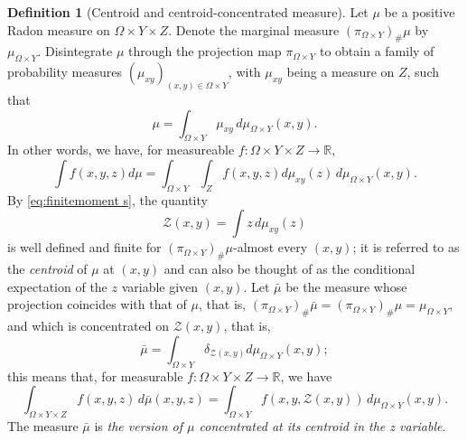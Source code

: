 \documentclass{article}
\newcommand{\R}{\mathbb{R}}
\theoremstyle{definition}
\newtheorem{definition}[theorem]{Definition}
\theoremstyle{remark}
\newcommand{\proj}{\pi}
\newcommand{\projXY}{\proj_{\Omega\times Y}}
\begin{document}
\begin{definition}[Centroid and centroid-concentrated measure]
\label{def:centroid}
 Let $\mu$ be a positive Radon measure on $\Omega\times Y\times Z$.
 Denote the marginal measure $(\projXY)_\#\mu$ by $\mu_{\Omega\times Y}$.
 Disintegrate $\mu$ through the projection map $\projXY{}$
to obtain a family of probability measures $(\mu_{xy})_{(x,y)\in\Omega\times Y}$, with $\mu_{xy}$ being a measure on $Z$, such that
%
\[\mu=\int_{\Omega\times Y}\mu_{xy}\,d \mu_{\Omega\times Y}(x,y).\]
In other words, we have, for measureable $f\colon\Omega\times Y\times Z\to\R$,
\[\int f(x,y,z) d\mu=\int_{\Omega\times Y} \int_Z f(x,y,z)d\mu_{xy}(z)\,d \mu_{\Omega\times Y}(x,y).\]
%
By \eqref{eq:finitemoment s}, the quantity
\begin{equation}\label{eq:defZ}
 \mathcal Z(x,y)=\int z\,d\mu_{xy}(z)
\end{equation}
is well defined and finite for $(\projXY)_\#\mu$-almost every $(x,y)$; it is referred to as the \emph{centroid} of $\mu$ at $(x,y)$ and can also be thought of as the conditional expectation of the $z$ variable given $(x,y)$. Let $\bar \mu$ be the measure whose projection coincides with that of $\mu$, that is, $(\projXY)_\#\bar\mu=(\projXY)_\#\mu=\mu_{\Omega\times Y}$, and which is concentrated on $\mathcal Z(x,y)$, that is,
\[\bar\mu=\int_{\Omega\times Y}\delta_{\mathcal Z(x,y)}d\mu_{\Omega\times Y}(x,y);\]
this means that, for measurable $f\colon\Omega\times Y\times Z\to\R$, we have
\[\int_{\Omega\times Y\times Z}f(x,y,z)\,d\bar\mu(x,y,z)=\int_{\Omega\times Y}f(x,y,\mathcal Z(x,y))\,d\mu_{\Omega\times Y}(x,y).\]
The measure $\bar\mu$ is \emph{the version of $\mu$ concentrated at its centroid in the z variable}. 
\end{definition}
\end{document}
